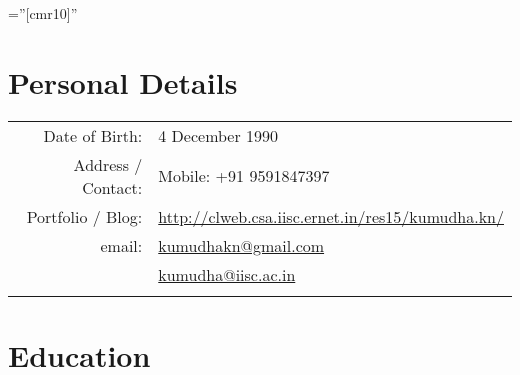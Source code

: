 \documentclass[a4paper,10pt]{article} %
\begin{document}
\pagestyle{empty} %

\font\fb=''[cmr10]'' %


\par{\bigskip\par} %

\section{Personal Details}
\begin{tabular}{rl}
Date of Birth: & 4 December 1990 \\
Address / Contact: & Mobile: +91 9591847397 \\
Portfolio / Blog: & \href{http://clweb.csa.iisc.ernet.in/res15/kumudha.kn/}{http://clweb.csa.iisc.ernet.in/res15/kumudha.kn/}\\
email: & \href{mailto:kumudhakn@gmail.com}{kumudhakn@gmail.com}\\ 
& \href{mailto:kumudha@iisc.ac.in}{kumudha@iisc.ac.in}\\
&\\
\end{tabular}


\section{Education}
\end{document}
